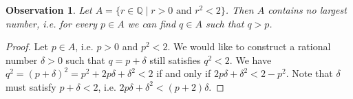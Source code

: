 \documentclass[10pt,varwidth=6in,margin=0.2in,preview]{standalone}
\newtheorem*{_observation}{Observation}
\begin{document}
\begin{flushleft}

\begin{_observation}
Let $A = \{ r \in \mathbb{Q} \mid r > 0 \text{ and } r^2 < 2 \}$.
Then $A$ contains no largest number, i.e. for every $p \in A$ we can find $q \in A$ such that $q > p$.
\end{_observation}

\begin{proof}
Let $p \in A$, i.e. $p > 0$ and $p^2 < 2$.
We would like to construct a rational number $\delta > 0$ such that $q = p + \delta$ still satisfies $q^2 < 2$.
We have $q^2 = (p + \delta)^2 = p^2 + 2 p \delta + \delta^2 < 2$ if and only if $2 p \delta + \delta^2 < 2 - p^2$.
Note that $\delta$ must satisfy $p + \delta < 2$, 
i.e. $2 p \delta + \delta^2 < (p + 2) \delta$.

\end{proof}
\end{flushleft}
\end{document}
